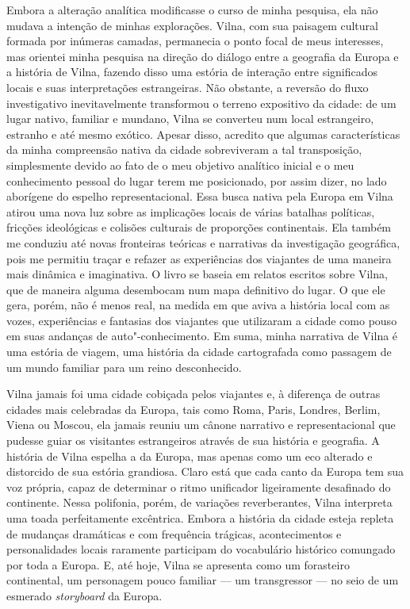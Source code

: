 Embora a alteração analítica modificasse o curso de minha pesquisa, ela
não mudava a intenção de minhas explorações. Vilna, com sua paisagem
cultural formada por inúmeras camadas, permanecia o ponto focal de meus
interesses, mas orientei minha pesquisa na direção do diálogo entre a
geografia da Europa e a história de Vilna, fazendo disso uma estória de
interação entre significados locais e suas interpretações estrangeiras.
Não obstante, a reversão do fluxo investigativo inevitavelmente
transformou o terreno expositivo da cidade: de um lugar nativo, familiar
e mundano, Vilna se converteu num local estrangeiro, estranho e até
mesmo exótico. Apesar disso, acredito que algumas características da
minha compreensão nativa da cidade sobreviveram a tal transposição,
simplesmente devido ao fato de o meu objetivo analítico inicial e o meu
conhecimento pessoal do lugar terem me posicionado, por assim dizer, no
lado aborígene do espelho representacional. Essa busca nativa pela
Europa em Vilna atirou uma nova luz sobre as implicações locais de
várias batalhas políticas, fricções ideológicas e colisões culturais de
proporções continentais. Ela também me conduziu até novas fronteiras
teóricas e narrativas da investigação geográfica, pois me permitiu
traçar e refazer as experiências dos viajantes de uma maneira mais
dinâmica e imaginativa. O livro se baseia em relatos escritos sobre
Vilna, que de maneira alguma desembocam num mapa definitivo do lugar. O
que ele gera, porém, não é menos real, na medida em que aviva a história
local com as vozes, experiências e fantasias dos viajantes que
utilizaram a cidade como pouso em suas andanças de auto"-conhecimento. Em
suma, minha narrativa de Vilna é uma estória de viagem, uma história da
cidade cartografada como passagem de um mundo familiar para um reino
desconhecido.

Vilna jamais foi uma cidade cobiçada pelos viajantes e, à diferença de
outras cidades mais celebradas da Europa, tais como Roma, Paris,
Londres, Berlim, Viena ou Moscou, ela jamais reuniu um cânone narrativo
e representacional que pudesse guiar os visitantes estrangeiros através
de sua história e geografia. A história de Vilna espelha a da Europa,
mas apenas como um eco alterado e distorcido de sua estória grandiosa.
Claro está que cada canto da Europa tem sua voz própria, capaz de
determinar o ritmo unificador ligeiramente desafinado do continente.
Nessa polifonia, porém, de variações reverberantes, Vilna interpreta uma
toada perfeitamente excêntrica. Embora a história da cidade esteja
repleta de mudanças dramáticas e com frequência trágicas, acontecimentos
e personalidades locais raramente participam do vocabulário histórico
comungado por toda a Europa. E, até hoje, Vilna se apresenta como um
forasteiro continental, um personagem pouco familiar --- um transgressor ---
no seio de um esmerado \textit{storyboard} da Europa.

